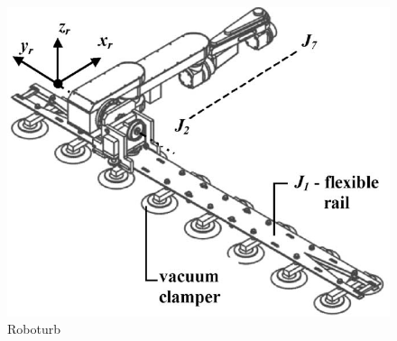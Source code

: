 
\begin{figure}[h!]
    \centering
    \includegraphics[scale=0.2]{figs/trilhos/roboturbpaper}
    \caption{Roboturb}
    \label{fig::roboturb}
\end{figure}%


